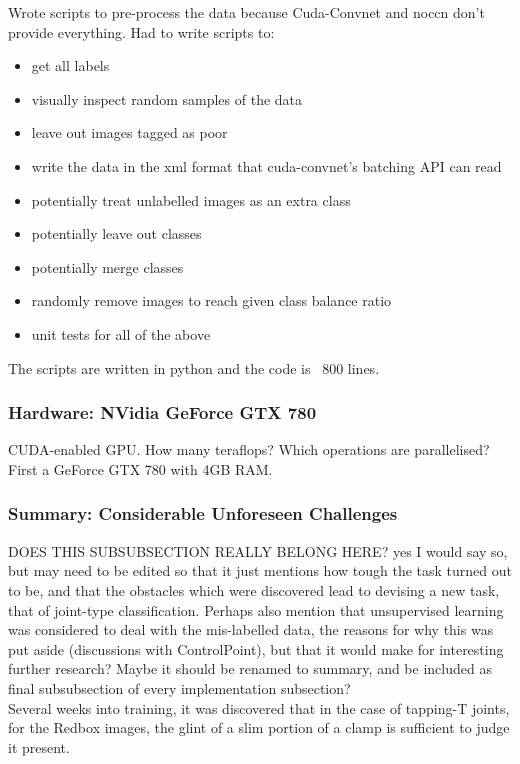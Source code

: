 \documentclass[a4paper,11pt]{article}
\begin{document}
Wrote scripts to pre-process the data because Cuda-Convnet and noccn don't provide everything. Had to write scripts to:
\begin{itemize}
\item get all labels
\item visually inspect random samples of the data
\item leave out images tagged as poor
\item write the data in the xml format that cuda-convnet's batching API can read
\item potentially treat unlabelled images as an extra class
\item potentially leave out classes 
\item potentially merge classes
\item randomly remove images to reach given class balance ratio
\item unit tests for all of the above
\end{itemize}
The scripts are written in python and the code is ~800 lines.


\subsubsection{Hardware: NVidia GeForce GTX 780}

CUDA-enabled GPU. How many teraflops? Which operations are parallelised? 
First a GeForce GTX 780 with 4GB RAM. 

\subsubsection{Summary: Considerable Unforeseen Challenges}

DOES THIS SUBSUBSECTION REALLY BELONG HERE? yes I would say so, but may need to be edited so that it just mentions how tough the task turned out to be, and that the obstacles which were discovered lead to devising a new task, that of joint-type classification. Perhaps also mention that unsupervised learning was considered to deal with the mis-labelled data, the reasons for why this was put aside (discussions with ControlPoint), but that it would make for interesting further research? Maybe it should be renamed to summary, and be included as final subsubsection of every implementation subsection? \\

Several weeks into training, it was discovered that in the case of tapping-T joints, for the Redbox images, the glint of a slim portion of a clamp is sufficient to judge it present. \\
\end{document}
